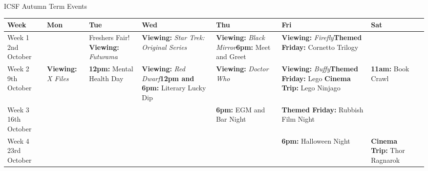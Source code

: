 \begin{landscape}
\noindent

\begin{center}
{\Large ICSF Autumn Term Events}
\end{center}

\scriptsize
\begin{tabular}{p{13mm}|p{30mm}p{31mm}p{31mm}p{33mm}p{33mm}p{31mm}p{0mm}}
		Week & Mon & Tue & Wed & Thu & Fri & Sat\footnotemark[1] & 
	\\
	\hline
		 Week 1 \newline 2nd \newline October &
			&
			Freshers Fair! 
			\newline \textbf{Viewing:} \textit{Futurama}\footnotemark[2]&
			\textbf{Viewing:} \textit{Star Trek: Original Series}\footnotemark[2]&
			\textbf{Viewing:} \textit{Black Mirror}\footnotemark[2]
			\newline\textbf{6pm:} Meet and Greet\footnotemark[3]&
			\textbf{Viewing:} \textit{Firefly}\footnotemark[2]
			\newline\textbf{Themed Friday:} \newline Cornetto Trilogy&
	\\
		 Week 2 \newline 9th \newline October &
			\textbf{Viewing:} \textit{X Files}\footnotemark[2]&
			\textbf{12pm:} Mental Health Day&
			\textbf{Viewing:} \textit{Red Dwarf}\footnotemark[2]
			\newline\textbf{12pm and 6pm:} \newline Literary Lucky Dip&
			\textbf{Viewing:} \textit{Doctor Who}\footnotemark[2]&
			\textbf{Viewing:} \textit{Buffy}\footnotemark[2]
			\newline\textbf{Themed Friday:} Lego \newline \textbf{Cinema Trip:} Lego Ninjago&
			\textbf{11am:} Book Crawl&
	\\
		 Week 3 \newline 16th \newline October &
		 	&
		 	&
			&
			\textbf{6pm:} EGM and \newline Bar Night&
			\textbf{Themed Friday:} \newline Rubbish Film Night&
			&
	\\
		 Week 4 \newline 23rd \newline October &
			&
			&
			&
			&
			\textbf{6pm:} Halloween Night\footnotemark[3]&
			\textbf{Cinema Trip:} Thor Ragnarok\footnotemark[4]&



\end{tabular}
\end{landscape}
